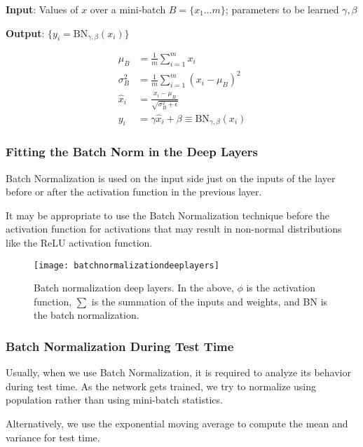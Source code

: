 	\vspace{\baselineskip}
	\begin{plainlist}
		\item {\bfseries Input}: Values of $x$ over a mini-batch $B = \{x_1 \ldots m \}$; parameters to be learned $\gamma, \beta$
		\item {\bfseries Output}: $\{ y_i = \textrm{B}\textrm{N}_{\gamma,\beta} \left(x_i\right) \}$
	\end{plainlist}

	\begin{align}
		\mu_B       &= \frac{1}{m} \sum_{i=1}^m x_i  \\
		\sigma_B^2  &= \frac{1}{m}  \sum_{i=1}^m \left( x_i - \mu_B \right)^2 \\
		\hat{x}_i   &= \frac{x_i - \mu_B}{\sqrt{\sigma_B^2 + \epsilon}}  \\
		y_i         &= \gamma\hat{x}_i + \beta \equiv \textrm{B}\textrm{N}_{\gamma,\beta} \left(x_i\right)
	\end{align}

	\subsubsection{Fitting the Batch Norm in the Deep Layers}
	\begin{bulletedlist}
		\item Batch Normalization is used on the input side just on the inputs of the layer before or after the activation function in the previous layer.
		\item It may be appropriate to use the Batch Normalization technique before the activation function for activations that may result in non-normal distributions like the ReLU activation function.
	\end{bulletedlist}

 	\begin{figure}[h]
		\centering
		\texttt{[image: batchnormalizationdeeplayers]}
		\caption{Batch normalization deep layers.  In the above, $\phi$ is the activation function, $\sum$ is the summation of the inputs and weights, and BN is the batch normalization.}
		\label{fig:batchnormalizationdeeplayers}
	\end{figure}

	\subsubsection{Batch Normalization During Test Time}
	\begin{bulletedlist}
		\item Usually, when we use Batch Normalization, it is required to analyze its behavior during test time.  As the network gets trained, we try to normalize using population rather than using mini-batch statistics.
		\item Alternatively, we use the exponential moving average to compute the mean and variance for test time.
	\end{bulletedlist}


